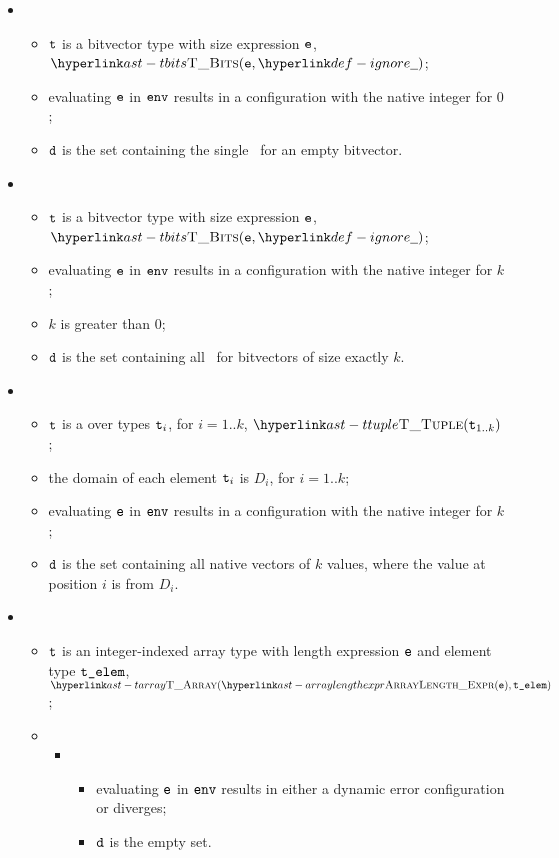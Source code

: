 \begin{itemize}
  \item {}
  \begin{itemize}
    \item $\texttt{t}$ is a bitvector type with size expression $\texttt{e}$, $\TBits(\ve, \Ignore)$;
    \item evaluating $\texttt{e}$ in $\texttt{env}$ results in a configuration with the native integer for $0$;
    \item $\texttt{d}$ is the set containing the single \nativevalue\ for an empty bitvector.
  \end{itemize}

  \item {}
  \begin{itemize}
    \item $\texttt{t}$ is a bitvector type with size expression $\texttt{e}$, $\TBits(\ve, \Ignore)$;
    \item evaluating $\texttt{e}$ in $\texttt{env}$ results in a configuration with the native integer for $k$;
    \item $k$ is greater than $0$;
    \item $\texttt{d}$ is the set containing all \nativevalues\ for bitvectors of size exactly $k$.
  \end{itemize}

  \item {}
  \begin{itemize}
    \item $\texttt{t}$ is a \tupletypeterm{} over types $\texttt{t}_i$, for $i=1..k$, $\TTuple(\vt_{1..k})$;
    \item the domain of each element $\texttt{t}_i$ is $D_i$, for $i=1..k$;
    \item evaluating $\texttt{e}$ in $\texttt{env}$ results in a configuration with the native integer for $k$;
    \item $\texttt{d}$ is the set containing all native vectors of $k$ values, where the value at position $i$
    is from $D_i$.
  \end{itemize}

  \item \AllApply
  \begin{itemize}
    \item $\texttt{t}$ is an integer-indexed array type with length expression $\texttt{e}$ and element type $\texttt{t\_elem}$, $\TArray(\ArrayLengthExpr(\ve), \telem)$;
    \item \OneApplies
      \begin{itemize}
      \item {}
      \begin{itemize}
        \item evaluating $\texttt{e}$ in $\texttt{env}$ results in either a dynamic error configuration or diverges;
        \item $\texttt{d}$ is the empty set.
      \end{itemize}


\end{itemize}
\end{itemize}
\end{itemize}
